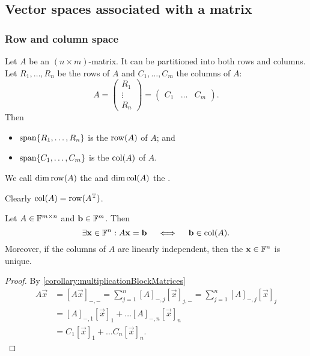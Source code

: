 \subsection{Vector spaces associated with a matrix}
\subsubsection{Row and column space}
\begin{definition}
Let $A$ be an $(n\times m)$-matrix. It can be partitioned into both rows and columns. Let $R_1,\ldots, R_n$ be the rows of $A$ and $C_1,\ldots, C_m$ the columns of $A$:
\[ A = \begin{pmatrix}
R_1 \\ \vdots \\ R_n
\end{pmatrix} = \begin{pmatrix}
C_1 & \hdots & C_m
\end{pmatrix}. \]
Then
\begin{itemize}
\item $\operatorname{span}\{R_1,\ldots, R_n\}$ is the  $\operatorname{row}(A)$ of $A$; and
\item $\operatorname{span}\{C_1,\ldots, C_m\}$ is the  $\operatorname{col}(A)$ of $A$.
\end{itemize}
We call $\dim\operatorname{row}(A)$ the  and $\dim\operatorname{col}(A)$ the .
\end{definition}
Clearly $\operatorname{col}(A) = \operatorname{row}(A^{\mathrm{T}})$.

\begin{lemma} \label{lemma:columnSpace}
Let $A\in \mathbb{F}^{m\times n}$ and $\bm{\mathrm{b}}\in \mathbb{F}^m$. Then
\[ \exists \bm{\mathrm{x}}\in\mathbb{F}^n: A\bm{\mathrm{x}}=\bm{\mathrm{b}} \quad\iff\quad \bm{\mathrm{b}}\in\operatorname{col}(A). \]
Moreover, if the columns of $A$ are linearly independent, then the $\bm{\mathrm{x}}\in\mathbb{F}^n$ is unique. 
\end{lemma}
\begin{proof}
By \ref{corollary:multiplicationBlockMatrices}
\begin{align*}
A\vec{x} &= [A\vec{x}]_{-,-} = \sum_{j=1}^n[A]_{-,j}[\vec{x}]_{j,-} = \sum_{j=1}^n[A]_{-,j}[\vec{x}]_{j} \\
&= [A]_{-,1}[\vec{x}]_1 + \ldots [A]_{-,n}[\vec{x}]_n  \\
&= C_1[\vec{x}]_1 + \ldots C_n[\vec{x}]_n.
\end{align*}
\end{proof}

